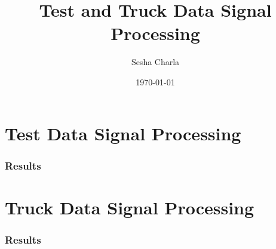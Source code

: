 \documentclass[letterpaper, 11pt]{article}
\title{Test and Truck Data Signal Processing}
\author{Sesha Charla}
\date{\today}
\begin{document}
\maketitle
\tableofcontents
\newpage

\newpage
\part{Test Data Signal Processing}

\newpage
\section{Results}
\newpage
\part{Truck Data Signal Processing}

\newpage
\section{Results}
\end{document}
